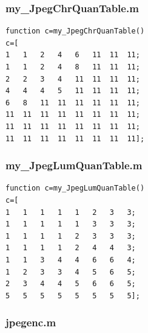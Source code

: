 \documentclass[12pt]{article}
\begin{document}
\subsubsection{my\_JpegChrQuanTable.m}

\begin{verbatim}
function c=my_JpegChrQuanTable()
c=[
1	1	2	4	6	11	11	11;
1	1	2	4	8	11	11	11;
2	2	3	4	11	11	11	11;
4	4	4	5	11	11	11	11;
6	8	11	11	11	11	11	11;
11	11	11	11	11	11	11	11;
11	11	11	11	11	11	11	11;
11	11	11	11	11	11	11	11];       
\end{verbatim}

\subsubsection{my\_JpegLumQuanTable.m}

\begin{verbatim}
function c=my_JpegLumQuanTable()
c=[
1	1	1	1	1	2	3	3;
1	1	1	1	1	3	3	3;
1	1	1	1	2	3	3	3;
1	1	1	1	2	4	4	3;
1	1	3	4	4	6	6	4;
1	2	3	3	4	5	6	5;
2	3	4	4	5	6	6	5;
5	5	5	5	5	5	5	5];   
\end{verbatim}

\subsubsection{jpegenc.m}
\end{document}
